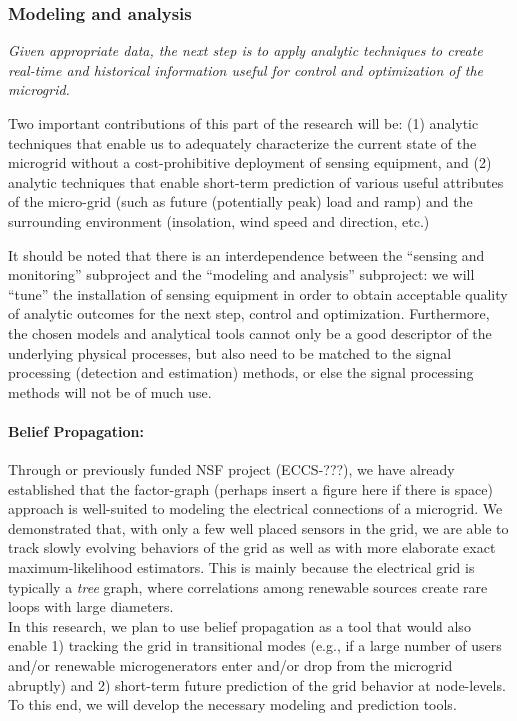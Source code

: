 
\subsubsection{Modeling and analysis}

{\em Given appropriate data, the next step is to apply analytic techniques
  to create real-time and historical information useful for control and
  optimization of the microgrid.

  Two important contributions of this part of the
  research will be: (1) analytic techniques that enable us to adequately
  characterize the current state of the microgrid without a
  cost-prohibitive deployment of sensing equipment, and (2) analytic
  techniques that enable short-term prediction of various useful attributes
  of the micro-grid (such as future (potentially peak) load and ramp) and
  the surrounding environment (insolation, wind speed and direction, etc.)

  It should be noted that there is an interdependence between the ``sensing
  and monitoring'' subproject and the ``modeling and analysis'' subproject:
  we will ``tune'' the installation of sensing equipment in order to obtain
  acceptable quality of analytic outcomes for the next step, control and
  optimization. Furthermore, the chosen models and analytical tools cannot
  only be a good descriptor of the underlying physical processes, but also
  need to be matched to the signal processing (detection and estimation)
  methods, or else the signal processing methods will not be of much use.}

\paragraph{Belief Propagation:} Through or previously funded NSF project (ECCS-???),
we have already established that the factor-graph ({\sc perhaps
insert a figure here if there is space}) approach is well-suited to
modeling the electrical connections of a microgrid. We demonstrated
that, with only a few well placed sensors in the grid, we are able
to track slowly evolving behaviors of the grid as well as with more
elaborate exact maximum-likelihood estimators. This is mainly
because the electrical grid is typically a {\em tree} graph, where
correlations among renewable sources create rare loops with large
diameters. \\
\indent In this research, we plan to use belief propagation as a
tool that would also enable 1) tracking the grid in transitional
modes (e.g., if a large number of users and/or renewable
microgenerators enter and/or drop from the microgrid abruptly) and
2) short-term future prediction of the grid behavior at node-levels.
To this end, we will develop the necessary modeling and prediction
tools.

